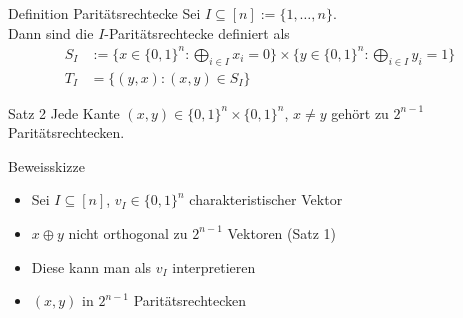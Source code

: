 \begin{frame}
    \begin{block}{Definition Parit\"atsrechtecke}
        Sei $I \subseteq [n] := \{1,\dots,n\}$.\\
        Dann sind die $I$-Parit\"atsrechtecke definiert als
        \begin{align*}
            S_I &:= \{ x \in \{0,1\}^n : \bigoplus_{i \in I} x_i = 0 \}
            \times \{ y \in \{0,1\}^n : \bigoplus_{i \in I} y_i = 1 \}\\
            T_I &= \{(y,x) : (x,y) \in S_I\}
        \end{align*}
    \end{block}
\end{frame}

\begin{frame}{}
    \begin{block}{Satz 2}
        Jede Kante $(x,y) \in \{0,1\}^n \times \{0,1\}^n$, $x\neq y$ geh\"ort zu $2^{n-1}$ Parit\"atsrechtecken.
    \end{block}
    \pause
    \begin{block}{Beweisskizze}
        \begin{itemize}
            \item Sei $I \subseteq [n]$, $v_I \in \{0,1\}^n$ charakteristischer Vektor
        \end{itemize}
        \pause
        \begin{itemize}
            \item $x \oplus y$ nicht orthogonal zu $2^{n-1}$ Vektoren (Satz 1)
        \end{itemize}
        \pause
        \begin{itemize}
            \item Diese kann man als $v_I$ interpretieren
        \end{itemize}
        \pause
        \begin{itemize}
            \item $(x,y)$ in $2^{n-1}$ Parit\"atsrechtecken
        \end{itemize}
    \end{block}
\end{frame}

